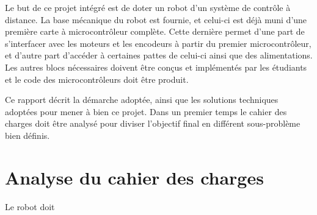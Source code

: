 Le but de ce projet intégré est de doter un robot d'un système de contrôle à distance. La base mécanique du robot est fournie, et celui-ci est déjà muni d'une première carte à microcontrôleur complète. Cette dernière permet d'une part de s'interfacer avec les moteurs et les encodeurs à partir du premier microcontrôleur, et d'autre part d'accéder à certaines pattes de celui-ci ainsi que des alimentations. Les autres blocs nécessaires doivent être conçus et implémentés par les étudiants et le code des microcontrôleurs doit être produit.

Ce rapport décrit la démarche adoptée, ainsi que les solutions techniques adoptées pour mener à bien ce projet. Dans un premier temps le cahier des charges doit être analysé pour diviser l'objectif final en différent sous-problème bien définis.

\section{Analyse du cahier des charges}
Le robot doit
